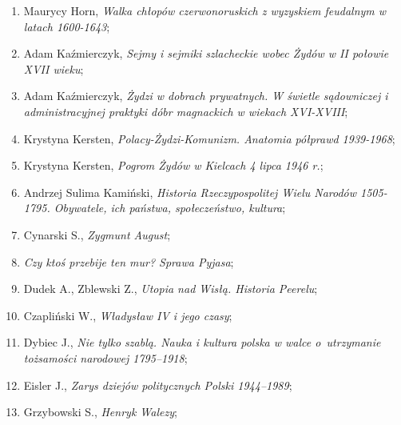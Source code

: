 \documentclass[a4paper,11pt]{article}
\begin{document}
\begin{enumerate}
\item Maurycy Horn, \textit{Walka chłopów czerwonoruskich z wyzyskiem
    feudalnym w latach 1600-1643};



\item Adam Kaźmierczyk, \textit{Sejmy i sejmiki szlacheckie wobec Żydów
    w II połowie XVII wieku};



\item Adam Kaźmierczyk, \textit{Żydzi w dobrach prywatnych. W świetle
    sądowniczej i administracyjnej praktyki dóbr magnackich w wiekach
    XVI-XVIII};



\item Krystyna Kersten, \textit{Polacy-Żydzi-Komunizm. Anatomia półprawd
    1939-1968};



\item Krystyna Kersten, \textit{Pogrom Żydów w Kielcach 4 lipca 1946
    r.};



\item Andrzej Sulima Kamiński, \textit{Historia Rzeczypospolitej Wielu
    Narodów 1505-1795. Obywatele, ich państwa, społeczeństwo,
    kultura};



\item Cynarski S., \textit{Zygmunt August};



\item \textit{Czy ktoś przebije ten mur? Sprawa Pyjasa};



\item Dudek A., Zblewski Z., \textit{Utopia nad Wisłą. Historia
    Peerelu};



\item Czapliński W., \textit{Władysław IV i jego czasy};



\item Dybiec J., \textit{Nie tylko szablą. Nauka i kultura polska w
    walce o~utrzymanie tożsamości narodowej 1795--1918};



\item Eisler J., \textit{Zarys dziejów politycznych Polski 1944--1989};



\item Grzybowski S., \textit{Henryk Walezy};




\end{enumerate}
\end{document}
